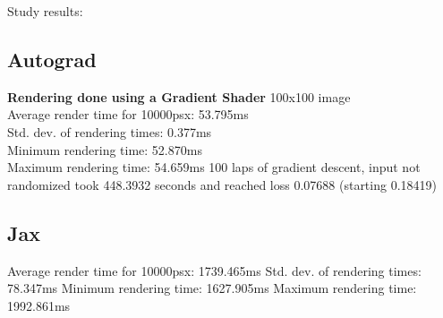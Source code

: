Study results:

\subsection{Autograd}

\textbf{Rendering done using a Gradient Shader}
100x100 image\\
Average render time for 10000psx: 53.795ms\\
Std. dev. of rendering times: 0.377ms\\
Minimum rendering time: 52.870ms\\
Maximum rendering time: 54.659ms
100 laps of gradient descent, input not randomized took 448.3932 seconds and reached loss 0.07688 (starting 0.18419)


\subsection{Jax}
Average render time for 10000psx: 1739.465ms
Std. dev. of rendering times: 78.347ms
Minimum rendering time: 1627.905ms
Maximum rendering time: 1992.861ms